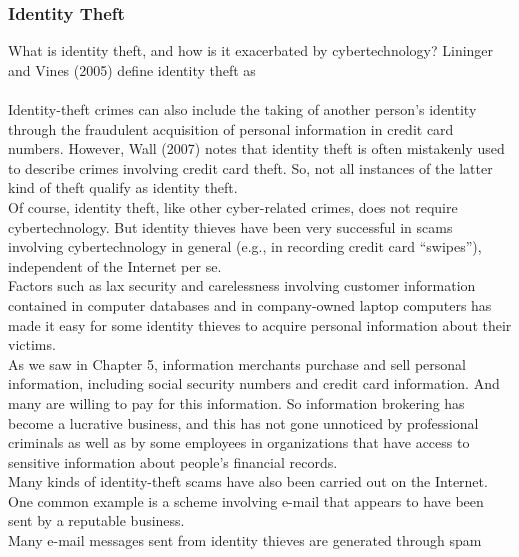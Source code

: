 \documentclass[12pt]{article}
\theoremstyle{definition}
\begin{document}
\subsubsection{Identity Theft}
What is identity theft, and how is it exacerbated by cybertechnology? Lininger and Vines
(2005) define identity theft as\\
\\
Identity-theft crimes can also include the taking of another person’s identity through
the fraudulent acquisition of personal information in credit card numbers. However, Wall
(2007) notes that identity theft is often mistakenly used to describe crimes involving
credit card theft. So, not all instances of the latter kind of theft qualify as identity theft.\\
Of course, identity theft, like other cyber-related crimes, does not require cybertechnology. But identity thieves have been very successful in scams involving cybertechnology in general (e.g., in recording credit card “swipes”), independent
of the Internet per se.\\
Factors such as lax security and carelessness involving customer information contained
in computer databases and in company-owned laptop computers has made it easy
for some identity thieves to acquire personal information about their victims.\\
As we saw in Chapter 5, information merchants purchase and sell personal information,
including social security numbers and credit card information. And many are
willing to pay for this information. So information brokering has become a lucrative
business, and this has not gone unnoticed by professional criminals as well as by some
employees in organizations that have access to sensitive information about people’s
financial records.\\
Many kinds of identity-theft scams have also been carried out on the Internet. One
common example is a scheme involving e-mail that appears to have been sent by a
reputable business.\\
Many e-mail messages sent from identity thieves are generated through spam
\end{document}
